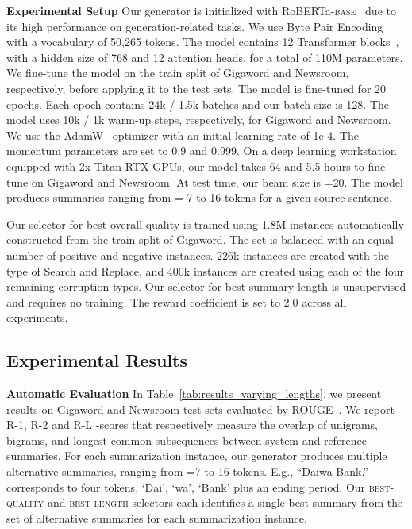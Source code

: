 \documentclass[11pt]{article}
\begin{document}
\vspace{0.08in}
\noindent\textbf{Experimental Setup}\quad
Our generator is initialized with RoBERTa-\textsc{base}~\cite{liu2019roberta} due to its high performance on generation-related tasks.
We use Byte Pair Encoding~\cite{sennrich-etal-2016-neural} with a vocabulary of 50,265 tokens.
The model contains 12 Transformer blocks~\cite{NIPS2017_7181}, with a hidden size of 768 and 12 attention heads, for a total of 110M parameters.
We fine-tune the model on the train split of Gigaword and Newsroom, respectively, before applying it to the test sets. 
The model is fine-tuned for 20 epochs. 
Each epoch contains 24k / 1.5k batches and our batch size is 128. 
The model uses 10k / 1k warm-up steps, respectively, for Gigaword and Newsroom.
We use the AdamW~\cite{loshchilov2017decoupled} optimizer with an initial learning rate of 1e-4.
The momentum parameters are set to 0.9 and 0.999.
On a deep learning workstation equipped with 2x Titan RTX GPUs, our model takes 64 and 5.5 hours to fine-tune on Gigaword and Newsroom.
At test time, our beam size is =20.
The model produces summaries ranging from  = 7 to 16 tokens for a given source sentence.


Our selector for best overall quality is trained using 1.8M instances automatically constructed from the train split of Gigaword.
The set is balanced with an equal number of positive and negative instances.
226k instances are created with the type of Search and Replace, and 400k instances are created using each of the four remaining corruption types.
Our selector for best summary length is unsupervised and requires no training. 
The reward coefficient  is set to 2.0 across all experiments.


\subsection{Experimental Results}
\label{sec:results}

\noindent\textbf{Automatic Evaluation}\quad\quad
In Table~\ref{tab:results_varying_lengths}, we present results on Gigaword and Newsroom test sets evaluated by ROUGE~\cite{lin-2004-rouge}.
We report R-1, R-2 and R-L -scores that respectively measure the overlap of unigrams, bigrams, and longest common subsequences between system and reference summaries.
For each summarization instance, our generator produces multiple alternative summaries, ranging from =7 to 16 tokens.
E.g., ``Daiwa Bank.'' corresponds to four tokens, `Dai', `wa', `Bank' plus an ending period.
Our \textsc{best-quality} and \textsc{best-length} selectors each identifies a single best summary from the set of alternative summaries for each summarization instance.
\end{document}
